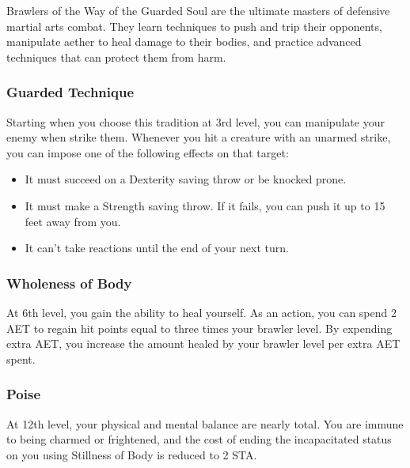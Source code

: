 Brawlers of the Way of the Guarded Soul are the ultimate masters of defensive martial arts combat. They learn techniques to push and trip their opponents, manipulate aether to heal damage to their bodies, and practice advanced techniques that can protect them from harm.

\subsubsection{Guarded Technique}

Starting when you choose this tradition at 3rd level, you can manipulate your enemy when strike them. Whenever you hit a creature with an unarmed strike, you can impose one of the following effects on that target:
\begin{itemize}
\item It must succeed on a Dexterity saving throw or be knocked prone.
\item It must make a Strength saving throw. If it fails, you can push it up to 15 feet away from you.
\item It can't take reactions until the end of your next turn.
\end{itemize}

\subsubsection{Wholeness of Body}

At 6th level, you gain the ability to heal yourself. As an action, you can spend 2 AET to regain hit points equal to three times your brawler level. By expending extra AET, you increase the amount healed by your brawler level per extra AET spent.

\subsubsection{Poise}
At 12th level, your physical and mental balance are nearly total. You are immune to being charmed or frightened, and the cost of ending the incapacitated status on you using Stillness of Body is reduced to 2 STA.


